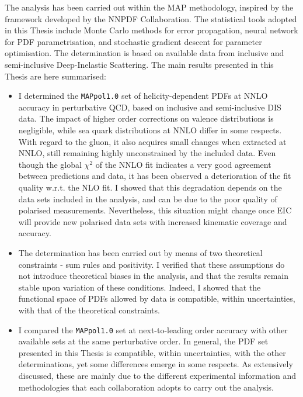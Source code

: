 The analysis has been carried out within the MAP methodology, inspired by the framework developed by the NNPDF Collaboration. The statistical tools adopted in this Thesis include Monte Carlo methods for error propagation, neural network for PDF parametrisation, and stochastic gradient descent for parameter optimisation. The determination is based on available data from inclusive and semi-inclusive Deep-Inelastic Scattering. The main results presented in this Thesis are here summarised:
%
\begin{itemize}
  \item I determined the \texttt{MAPpol1.0} set of helicity-dependent PDFs at NNLO accuracy in perturbative QCD, based on inclusive and semi-inclusive DIS data. The impact of higher order corrections on valence distributions is negligible, while sea quark distributions at NNLO differ in some respects. With regard to the gluon, it also acquires small changes when extracted at NNLO, still remaining highly unconstrained by the included data. Even though the global $\chi^2$ of the NNLO fit indicates a very good agreement between predictions and data, it has been observed a deterioration of the fit quality w.r.t. the NLO fit. I showed that this degradation depends on the data sets included in the analysis, and can be due to the poor quality of polarised measurements. Nevertheless, this situation might change once EIC will provide new polarised data sets with increased kinematic coverage and accuracy.
  \item The determination has been carried out by means of two theoretical constraints - sum rules and positivity. I verified that these assumptions do not introduce theoretical biases in the analysis, and that the results remain stable upon variation of these conditions. Indeed, I showed that the functional space of PDFs allowed by data is compatible, within uncertainties, with that of the theoretical constraints.
  \item I compared the \texttt{MAPpol1.0} set at next-to-leading order accuracy with other available sets \cite{Nocera:2014gqa, Ethier:2017zbq, deFlorian:2009vb} at the same perturbative order. In general, the PDF set presented in this Thesis is compatible, within uncertainties, with the other determinations, yet some differences emerge in some respects. As extensively discussed, these are mainly due to the different experimental information and methodologies that each collaboration adopts to carry out the analysis.
\end{itemize}
%


